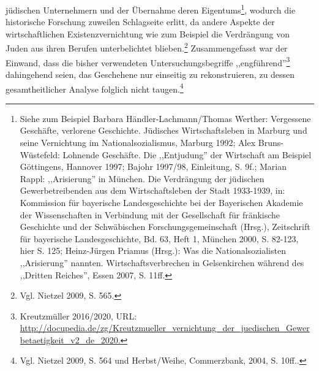 jüdischen Unternehmern und der Übernahme deren Eigentums\footnote{Siehe zum Beispiel Barbara Händler-Lachmann/Thomas Werther: Vergessene Geschäfte, verlorene Geschichte. Jüdisches Wirtschaftsleben in Marburg und seine Vernichtung im Nationalsozialismus, Marburg 1992; Alex Bruns-Wüstefeld: Lohnende Geschäfte. Die ,,Entjudung'' der Wirtschaft am Beispiel Göttingens, Hannover 1997; Bajohr 1997/98, Einleitung, S. 9f.; Marian Rappl: ,,Arisierung'' in München. Die Verdrängung der jüdischen Gewerbetreibenden aus dem Wirtschaftsleben der Stadt 1933-1939, in: Kommission für bayerische Landesgeschichte bei der Bayerischen Akademie der Wissenschaften in Verbindung mit der Gesellschaft für fränkische Geschichte und der Schwäbischen Forschungsgemeinschaft (Hrsg.), Zeitschrift für bayerische Landesgeschichte, Bd. 63, Heft 1, München 2000, S. 82-123, hier S. 125; Heinz-Jürgen Priamus (Hrsg.): Was die Nationalsozialisten ,,Arisierung'' nannten. Wirtschaftsverbrechen in Gelsenkirchen während des ,,Dritten Reiches'', Essen 2007, S. 11ff.}, wodurch die historische Forschung zuweilen Schlagseite erlitt, da andere Aspekte der wirtschaftlichen Existenzvernichtung wie zum Beispiel die Verdrängung von Juden aus ihren Berufen unterbelichtet blieben.\footnote{Vgl. Nietzel 2009, S. 565.} Zusammengefasst war der Einwand, dass die bisher verwendeten Untersuchungsbegriffe ,,engführend''\footnote{Kreutzmüller 2016/2020,  URL: \url{http://docupedia.de/zg/Kreutzmueller_vernichtung_der_juedischen_Gewerbetaetigkeit_v2_de_2020.}} dahingehend seien, das Geschehene nur einseitig zu rekonstruieren, zu dessen gesamtheitlicher Analyse folglich nicht taugen.\footnote{Vgl. Nietzel 2009, S. 564 und Herbst/Weihe, Commerzbank, 2004, S. 10ff..}

